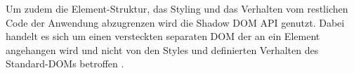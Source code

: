 Um zudem die Element-Struktur, das Styling und das Verhalten vom restlichen Code der Anwendung abzugrenzen wird
die Shadow DOM API genutzt.
Dabei handelt es sich um einen versteckten separaten DOM der an ein Element angehangen wird und nicht
von den Styles und definierten Verhalten des Standard-DOMs betroffen \parencite{WebDocsShadowDOM}.
